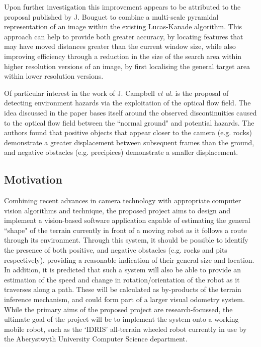 Upon further investigation this improvement appears to be attributed to the proposal published by J. Bouguet \cite{j-bouguet} to combine a multi-scale pyramidal representation of an image within the existing Lucas-Kanade algorithm. This approach can help to provide both greater accuracy, by locating features that may have moved distances greater than the current window size, while also improving efficiency through a reduction in the size of the search area within higher resolution versions of an image, by first localising the general target area within lower resolution versions. 

Of particular interest in the work of J. Campbell \textit{et al.} \cite{j-campbell} is the proposal of detecting environment hazards via the exploitation of the optical flow field. The idea discussed in the paper bases itself around the observed discontinuities caused to the optical flow field between the ``normal ground" and potential hazards. The authors found that positive objects that appear closer to the camera (e.g. rocks) demonstrate a greater displacement between subsequent frames than the ground, and negative obstacles (e.g. precipices) demonstrate a smaller displacement. 
   

\subsection{Motivation}

Combining recent advances in camera technology with appropriate computer vision algorithms and technique, the proposed project aims to design and implement a vision-based software application capable of estimating the general ``shape" of the terrain currently in front of a moving robot as it follows a route through its environment. Through this system, it should be possible to identify the presence of both positive, and negative obstacles (e.g. rocks and pits respectively), providing a reasonable indication of their general size and location. \\

In addition, it is predicted that such a system will also be able to provide an estimation of the speed and change in rotation/orientation of the robot as it traverses along a path. These will be calculated as by-products of the terrain inference mechanism, and could form part of a larger visual odometry system. \\

While the primary aims of the proposed project are research-focussed, the ultimate goal of the project will be to implement the system onto a working mobile robot, such as the `IDRIS' all-terrain wheeled robot currently in use by the Aberystwyth University Computer Science department. \\

